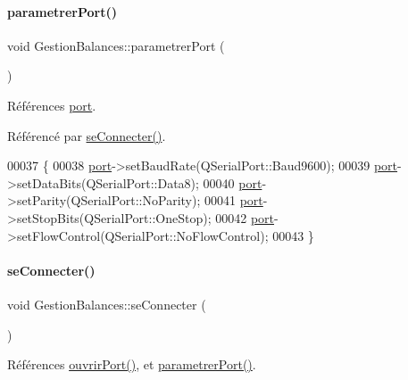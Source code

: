 \paragraph{\texorpdfstring{parametrer\+Port()}{parametrerPort()}}
{\footnotesize\ttfamily void Gestion\+Balances\+::parametrer\+Port (\begin{DoxyParamCaption}{ }\end{DoxyParamCaption})\hspace{0.3cm}{\ttfamily [private]}}



Références \hyperlink{class_gestion_balances_a7e40205180eb65dab0b5cdebd628f794}{port}.



Référencé par \hyperlink{class_gestion_balances_ac3bb603b39f9b89732da2dc576903924}{se\+Connecter()}.


\begin{DoxyCode}
00037 \{
00038     \hyperlink{class_gestion_balances_a7e40205180eb65dab0b5cdebd628f794}{port}->setBaudRate(QSerialPort::Baud9600);
00039     \hyperlink{class_gestion_balances_a7e40205180eb65dab0b5cdebd628f794}{port}->setDataBits(QSerialPort::Data8);
00040     \hyperlink{class_gestion_balances_a7e40205180eb65dab0b5cdebd628f794}{port}->setParity(QSerialPort::NoParity);
00041     \hyperlink{class_gestion_balances_a7e40205180eb65dab0b5cdebd628f794}{port}->setStopBits(QSerialPort::OneStop);
00042     \hyperlink{class_gestion_balances_a7e40205180eb65dab0b5cdebd628f794}{port}->setFlowControl(QSerialPort::NoFlowControl);
00043 \}
\end{DoxyCode}
\mbox{\label{class_gestion_balances_ac3bb603b39f9b89732da2dc576903924}} 
\paragraph{\texorpdfstring{se\+Connecter()}{seConnecter()}}
{\footnotesize\ttfamily void Gestion\+Balances\+::se\+Connecter (\begin{DoxyParamCaption}{ }\end{DoxyParamCaption})}



Références \hyperlink{class_gestion_balances_a8d7031310e6b9530c0a9e47c142aaf39}{ouvrir\+Port()}, et \hyperlink{class_gestion_balances_aca48b0074aaef7b8d4d9da45c3d6a3a9}{parametrer\+Port()}.



